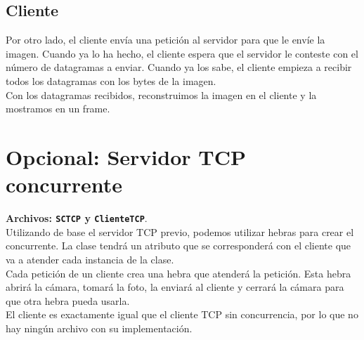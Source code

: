 \documentclass[11pt,a4paper]{article}
\begin{document}
\subsection{Cliente}

Por otro lado, el cliente envía una petición al servidor para que le envíe la imagen. Cuando ya lo ha hecho, el cliente espera que el servidor le conteste con el número de datagramas a enviar. Cuando ya los sabe, el cliente empieza a recibir todos los datagramas con los bytes de la imagen.\\

Con los datagramas recibidos, reconstruimos la imagen en el cliente y la mostramos en un frame.

\section{Opcional: Servidor TCP concurrente}

\color{deepgreen}\textbf{Archivos: \texttt{SCTCP} y \texttt{ClienteTCP}}.\color{black}\\

Utilizando de base el servidor TCP previo, podemos utilizar hebras para crear el concurrente. La clase tendrá un atributo que se corresponderá con el cliente que va a atender cada instancia de la clase.\\

Cada petición de un cliente crea una hebra que atenderá la petición. Esta hebra abrirá la cámara, tomará la foto, la enviará al cliente y cerrará la cámara para que otra hebra pueda usarla.\\

El cliente es exactamente igual que el cliente TCP sin concurrencia, por lo que no hay ningún archivo con su implementación.
\end{document}
